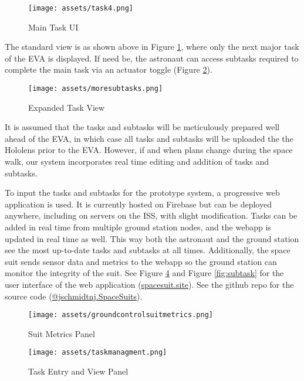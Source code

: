 \documentclass{article}
\begin{document}
\begin{figure}[!htb]
  \centering
  \texttt{[image: assets/task4.png]}
  \caption{Main Task UI}
  \label{fig:task4}
\end{figure}

The standard view is as shown above in Figure \ref{fig:task4}, where only the next major task of the EVA is displayed. If need be, the astronaut can access subtasks required to complete the main task via an actuator toggle (Figure \ref{fig:moresubtasks}).

\begin{figure}[!htb]
  \centering
  \texttt{[image: assets/moresubtasks.png]}
  \caption{Expanded Task View}
  \label{fig:moresubtasks}
\end{figure}

It is assumed that the tasks and subtasks will be meticulously prepared well ahead of the EVA, in which case all tasks and subtasks will be uploaded the the Hololens prior to the EVA. However, if and when plans change during the space walk, our system incorporates real time editing and addition of tasks and subtasks.

To input the tasks and subtasks for the prototype system, a progressive web application is used. It is currently hosted on Firebase but can be deployed anywhere, including on servers on the ISS, with slight modification. Tasks can be added in real time from multiple ground station nodes, and the webapp is updated in real time as well. This way both the astronaut and the ground station see the most up-to-date tasks and subtasks at all times. Additionally, the space suit sends sensor data and metrics to the webapp so the ground station can monitor the integrity of the suit. See Figure \ref{fig:taskmanagment} and Figure \ref{fig:subtask} for the user interface of the web application (\href{https://spacesuit.site}{spacesuit.site}). See the github repo for the source code (\href{https://github.com/jschmidtnj/spacesuits}{@jschmidtnj.SpaceSuits}).

\begin{figure}[!htb]
  \centering
  \texttt{[image: assets/groundcontrolsuitmetrics.png]}
  \caption{Suit Metrics Panel}
  \label{fig:groundcontrolsuitmetrics}
\end{figure}

\begin{figure}[!htb]
  \centering
  \texttt{[image: assets/taskmanagment.png]}
  \caption{Task Entry and View Panel}
  \label{fig:taskmanagment}
\end{figure}
\end{document}
